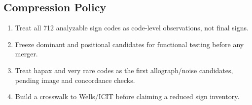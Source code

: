 ﻿\documentclass[11pt,a4paper]{article}
\begin{document}
\subsection*{Compression Policy}
\begin{enumerate}
\item Treat all 712 analyzable sign codes as code-level observations, not final signs.
\item Freeze dominant and positional candidates for functional testing before any merger.
\item Treat hapax and very rare codes as the first allograph/noise candidates, pending image and concordance checks.
\item Build a crosswalk to Wells/ICIT before claiming a reduced sign inventory.
\end{enumerate}
\end{document}
